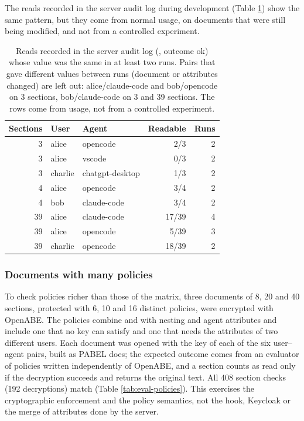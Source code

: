 The reads recorded in the server audit log during development (Table \ref{tab:eval-audit}) show the same pattern, but they come from normal usage, on documents that were still being modified, and not from a controlled experiment.

\begin{table}[H]
  \centering
  \begingroup\linespread{1.0}\small
  \begin{tabular}{@{}rllrr@{}}
    \toprule
    \textbf{Sections} & \textbf{User} & \textbf{Agent} & \textbf{Readable} & \textbf{Runs} \\
    \midrule
    3  & alice   & opencode        & 2/3   & 2 \\
    3  & alice   & vscode          & 0/3   & 2 \\
    3  & charlie & chatgpt-desktop & 1/3   & 2 \\
    4  & alice   & opencode        & 3/4   & 2 \\
    4  & bob     & claude-code     & 3/4   & 2 \\
    39 & alice   & claude-code     & 17/39 & 4 \\
    39 & alice   & opencode        & 5/39  & 3 \\
    39 & charlie & opencode        & 18/39 & 2 \\
    \bottomrule
  \end{tabular}
  \endgroup
  \caption{Reads recorded in the server audit log (, outcome ok) whose value was the same in at least two runs. Pairs that gave different values between runs (document or attributes changed) are left out: alice/claude-code and bob/opencode on 3 sections, bob/claude-code on 3 and 39 sections. The rows come from usage, not from a controlled experiment.}\label{tab:eval-audit}
\end{table}


\subsubsection{Documents with many policies}
To check policies richer than those of the matrix, three documents of 8, 20 and 40 sections, protected with 6, 10 and 16 distinct policies, were encrypted with OpenABE.
The policies combine  and  with nesting and agent attributes and include one that no key can satisfy and one that needs the attributes of two different users.
Each document was opened with the key of each of the six user--agent pairs, built as PABEL does; the expected outcome comes from an evaluator of policies written independently of OpenABE, and a section counts as read only if the decryption succeeds and returns the original text.
All 408 section checks (192 decryptions) match (Table \ref{tab:eval-policies}).
This exercises the cryptographic enforcement and the policy semantics, not the hook, Keycloak or the merge of attributes done by the server.

